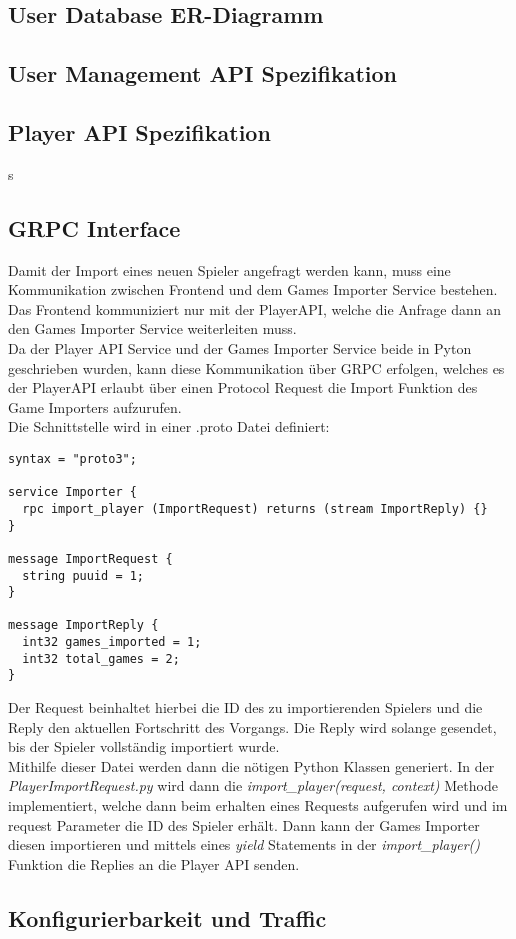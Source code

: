 \subsection{User Database ER-Diagramm}

\subsection{User Management API Spezifikation}

\subsection{Player API Spezifikation}s

\subsection{GRPC Interface}
Damit der Import eines neuen Spieler angefragt werden kann, muss eine Kommunikation zwischen Frontend und dem Games Importer Service bestehen. Das Frontend kommuniziert nur mit der PlayerAPI, welche die Anfrage dann an den Games Importer Service weiterleiten muss.\\
Da der Player API Service und der Games Importer Service beide in Pyton geschrieben wurden, kann diese Kommunikation über GRPC erfolgen, welches es der PlayerAPI erlaubt über einen Protocol Request die Import Funktion des Game Importers aufzurufen.\\ %
Die Schnittstelle wird in einer .proto Datei definiert:

\begin{lstlisting}
syntax = "proto3";

service Importer {
  rpc import_player (ImportRequest) returns (stream ImportReply) {}
}

message ImportRequest {
  string puuid = 1;
}

message ImportReply {
  int32 games_imported = 1;
  int32 total_games = 2;
}
\end{lstlisting}
Der Request beinhaltet hierbei die ID des zu importierenden Spielers und die Reply den aktuellen Fortschritt des Vorgangs. Die Reply wird solange gesendet, bis der Spieler vollständig importiert wurde.\\
Mithilfe dieser Datei werden dann die nötigen Python Klassen generiert. In der \textit{PlayerImportRequest.py} wird dann die \textit{import\_player(request, context)} Methode implementiert, welche dann beim erhalten eines Requests aufgerufen wird und im request Parameter die ID des Spieler erhält. Dann kann der Games Importer diesen importieren und mittels eines \textit{yield} Statements in der \textit{import\_player()} Funktion die Replies an die Player API senden.

\subsection{Konfigurierbarkeit und Traffic}